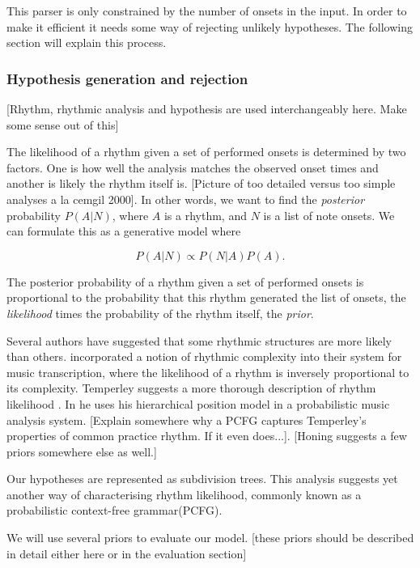 This parser is only constrained by the number of onsets in the input. In order to make it efficient it needs some way of rejecting unlikely hypotheses. The following section will explain this process.


\subsubsection{Hypothesis generation and rejection}

[Rhythm, rhythmic analysis and hypothesis are used interchangeably here. Make some sense out of this]

The likelihood of a rhythm given a set of performed onsets is determined by two factors. One is how well the analysis matches the observed onset times and another is likely the rhythm itself is. [Picture of too detailed versus too simple analyses a la cemgil 2000]. In other words, we want to find the \textit{posterior} probability $P(A|N)$, where $A$ is a rhythm, and $N$ is a list of note onsets. We can formulate this as a generative model where

\begin{equation}
\label{eq:model}
P(A|N) \propto P(N|A)P(A).
\end{equation}

The posterior probability of a rhythm given a set of performed onsets is proportional to the probability that this rhythm generated the list of onsets, the \textit{likelihood} times the probability of the rhythm itself, the \textit{prior}.

Several authors have suggested that some rhythmic structures are more likely than others. \cite{cemgil2000rhythm} incorporated a notion of rhythmic complexity into their system for music transcription, where the likelihood of a rhythm is inversely proportional to its complexity. Temperley suggests a more thorough description of rhythm likelihood \citep{temperley2010modeling}. In \cite{temperley2009unified} he uses his hierarchical position model in a probabilistic music analysis system. [Explain somewhere why a PCFG captures Temperley's properties of common practice rhythm. If it even does...]. [Honing suggests a few priors somewhere else as well.]

Our hypotheses are represented as subdivision trees. This analysis suggests yet another way of characterising rhythm likelihood, commonly known as a probabilistic context-free grammar(PCFG). 

We will use several priors to evaluate our model. [these priors should be described in detail either here or in the evaluation section]

